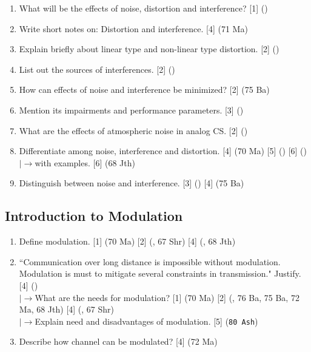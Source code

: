 \documentclass[12pt]{article}
\newcommand{\lb}{\\$\left|\rightarrow\right.$}
\begin{document}
\begin{enumerate}[topsep=0pt, noitemsep]
        \item What will be the effects of noise, distortion and interference? \hfill [1] ()
        
        \item Write short notes on: Distortion and interference. \hfill [4] (71 Ma)
        
        \item Explain briefly about linear type and non-linear type distortion. \hfill [2] ()

        \item List out the sources of interferences. \hfill [2] ()

        \item How can effects of noise and interference be minimized? \hfill [2] (75 Ba)

        \item Mention its impairments and performance parameters. \hfill [3] ()

        \item What are the effects of atmospheric noise in analog CS. \hfill [2] ()
        
        \item Differentiate among noise, interference and distortion. \hfill [4] (70 Ma) [5] () [6] ()
        \lb with examples. \hfill [6] (68 Jth)

        \item Distinguish between noise and interference. \hfill [3] () [4] (75 Ba)
      \end{enumerate}
      
  \subsection{Introduction to Modulation}
      \begin{enumerate}[topsep=0pt, noitemsep]
        \item Define modulation. \hfill [1] (70 Ma) [2] (, 67 Shr) [4] (, 68 Jth)

        \item ``Communication over long distance is impossible without modulation. Modulation is must to mitigate several constraints in transmission." Justify. \hfill [4] ()
        \lb What are the needs for modulation? \hfill [1] {\tiny (70 Ma)} [2] {\tiny (, 76 Ba, 75 Ba, 72 Ma, 68 Jth)} [4] {\tiny (, 67 Shr)}
        \lb Explain need and disadvantages of modulation. \hfill [5] (\texttt{80 Ash})

        \item Describe how channel can be modulated? \hfill [4] (72 Ma)
      \end{enumerate}
\end{document}
